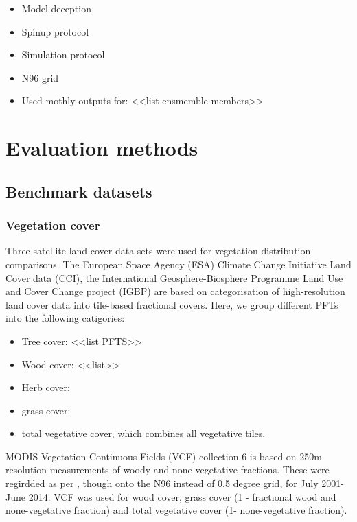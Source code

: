  
\begin{itemize}
    \item Model deception \citep{Sellar2019-bo}
    \item Spinup protocol \citep{yool2020spin}
    \item Simulation protocol \citep{sellar2020implementation}
    \item N96 grid
    \item Used mothly outputs for: <<list ensmemble members>>
\end{itemize}

\section{Evaluation methods}

\subsection{Benchmark datasets}

\subsubsection{Vegetation cover}
Three satellite land cover data sets were used for vegetation distribution comparisons. The European Space Agency (ESA) Climate Change Initiative Land Cover data (CCI)\cite{hartley2017uncertainty}, the International Geosphere-Biosphere Programme Land Use and Cover Change project (IGBP) \citep{Loveland2000-sx} are based on categorisation of high-resolution land cover data into tile-based fractional covers. Here, we group different PFTs into the following catigories:
\begin{itemize}
    \item Tree cover: <<list PFTS>>
    \item Wood cover: <<list>>
    \item Herb cover: 
    \item grass cover:
    \item total vegetative cover, which combines all vegetative tiles.
\end{itemize}


MODIS Vegetation Continuous Fields (VCF) collection 6 \citep{Dimiceli_undated-el} is based on 250m resolution measurements of woody and none-vegetative fractions. These were regirdded as per \citep{Kelley2019-yu}, though onto the N96 instead of 0.5 degree grid, for July 2001- June 2014. VCF was used for wood cover, grass cover (1 - fractional wood and none-vegetative fraction) and  total vegetative cover (1- none-vegetative fraction).

